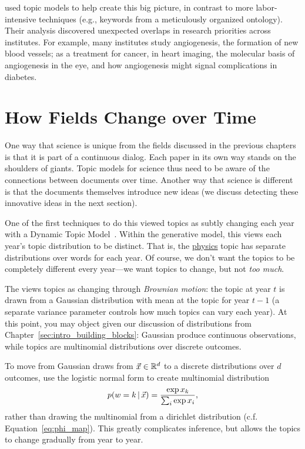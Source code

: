 \citet{talley-11} used topic models to help create this big picture,
in contrast to more labor-intensive techniques (e.g., keywords from a
meticulously organized ontology).  Their analysis discovered
unexpected overlaps in research priorities across institutes.  For
example, many institutes study angiogenesis, the formation of new
blood vessels; as a treatment for cancer, in heart imaging, the
molecular basis of angiogenesis in the eye, and how angiogenesis might
signal complications in diabetes.

\section{How Fields Change over Time}
\label{sec:sci_change}

One way that science is unique from the fields discussed in the
previous chapters is that it is part of a continuous dialog.  Each
paper in its own way stands on the shoulders of giants. Topic models
for science thus need to be aware of the connections between documents
over time.  Another way that science is different is that the
documents themselves introduce new ideas (we discuss detecting these
innovative ideas in the next section).

One of the first techniques to do this viewed topics as subtly
changing each year with a Dynamic Topic
Model~\citep[]{blei-06b}.  Within the generative model, this
views each year's topic distribution to be distinct.  That is, the
\underline{physics} topic has separate distributions over words for
each year.  Of course, we don't want the topics to be completely
different every year---we want topics to change, but not \emph{too
  much}.

The  views topics as changing through \emph{Brownian
  motion}: the topic at year $t$ is drawn from a Gaussian distribution
with mean at the topic for year $t-1$ (a separate variance parameter
controls how much topics can vary each year).  At this point, you may
object given our discussion of distributions from
Chapter~\ref{sec:intro_building_blocks}: Gaussian produce continuous
observations, while topics are multinomial distributions over discrete
outcomes.

To move from Gaussian draws from $\vec x \in \mathbb{R}^d$ to a discrete distributions
over $d$ outcomes, \citet{blei-06b} use the logistic normal form to
create multinomial distribution
\begin{equation}
p(w=k \, | \, \vec x)  = \frac{\exp{x_k}}{\sum_i \exp{x_i}},
\end{equation}
rather than drawing the multinomial from a dirichlet distribution
(c.f. Equation~\ref{eq:phi_map}).
This greatly complicates inference, but allows the topics to change
gradually from year to year.

